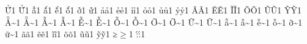 {{Ử}{{\h \UHORN}}1
{Ử}{{\h \Uhorn}}1
{ẳ}{{\h \abreve}}1
{ẩ}{{\h \acircumflex}}1
{ể}{{\h \ecircumflex}}1
{ổ}{{\h \ocircumflex}}1
{ở}{{\h \ohorn}}1
{ử}{{\h \uhorn}}1
{ả}{{\h a}}1
{ẻ}{{\h e}}1
{ỉ}{{\h i}}1
{ỏ}{{\h o}}1
{ủ}{{\h u}}1
{ỷ}{{\h y}}1
{Ã}{{\~A}}1
{Ẽ}{{\~E}}1
{Ĩ}{{\~I}}1
{Õ}{{\~O}}1
{Ũ}{{\~U}}1
{Ỹ}{{\~Y}}1
{Ẵ}{{\~\ABREVE}}1
{Ẵ}{{\~\Abreve}}1
{Ẫ}{{\~\ACIRCUMFLEX}}1
{Ẫ}{{\~\Acircumflex}}1
{Ễ}{{\~\ECIRCUMFLEX}}1
{Ễ}{{\~\Ecircumflex}}1
{Ỗ}{{\~\OCIRCUMFLEX}}1
{Ỗ}{{\~\Ocircumflex}}1
{Ỡ}{{\~\OHORN}}1
{Ỡ}{{\~\Ohorn}}1
{Ữ}{{\~\UHORN}}1
{Ữ}{{\~\Uhorn}}1
{ẵ}{{\~\abreve}}1
{ẫ}{{\~\acircumflex}}1
{ễ}{{\~\ecircumflex}}1
{ỗ}{{\~\ocircumflex}}1
{ỡ}{{\~\ohorn}}1
{ữ}{{\~\uhorn}}1
{ã}{{\~a}}1
{ẽ}{{\~e}}1
{ĩ}{{\~i}}1
{õ}{{\~o}}1
{ũ}{{\~u}}1
{ỹ}{{\~y}}1
{≥}{{$\geq$}}1%
{:́}{{\':}}1%
}

\makeatletter 
{}%
\makeatother